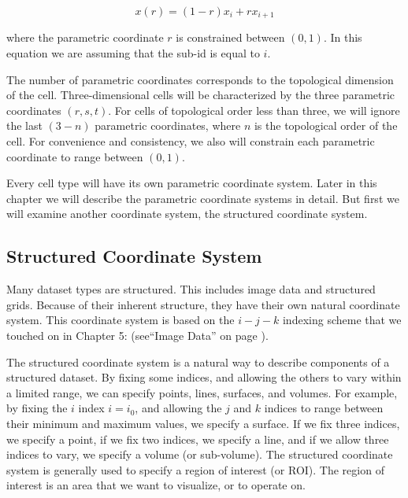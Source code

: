 \begin{equation}\label{eq:8.1}
x(r) = (1 - r) x_i + r x_{i + 1}
\end{equation}

where the parametric coordinate $r$ is constrained between $(0,1)$. In this equation we are assuming that the sub-id is equal to $i$.

The number of parametric coordinates corresponds to the topological dimension of the cell. Three-dimensional cells will be characterized by the three parametric coordinates $(r, s, t)$. For cells of topological order less than three, we will ignore the last $(3 - n)$ parametric coordinates, where $n$ is the topological order of the cell. For convenience and consistency, we also will constrain each parametric coordinate to range between $(0,1)$.

Every cell type will have its own parametric coordinate system. Later in this chapter we will describe the parametric coordinate systems in detail. But first we will examine another coordinate system, the structured coordinate system.

\subsection{Structured Coordinate System}
\label{subsec:structured_coordinate_system}

Many dataset types are structured. This includes image data and structured grids. Because of their inherent structure, they have their own natural coordinate system. This coordinate system is based on the $i-j-k$ indexing scheme that we touched on in Chapter 5:  (see``Image Data'' on page \pageref{subsec:image_data}).

The structured coordinate system is a natural way to describe components of a structured dataset. By fixing some indices, and allowing the others to vary within a limited range, we can specify points, lines, surfaces, and volumes. For example, by fixing the $i$ index $i = i_0$, and allowing the $j$ and $k$ indices to range between their minimum and maximum values, we specify a surface. If we fix three indices, we specify a point, if we fix two indices, we specify a line, and if we allow three indices to vary, we specify a volume (or sub-volume). The structured coordinate system is generally used to specify a region of interest (or ROI). The region of interest is an area that we want to visualize, or to operate on.

